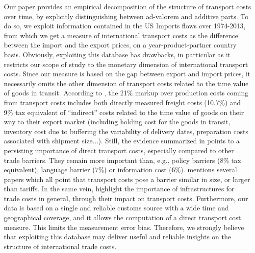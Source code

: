 \documentclass[a4paper,11pt]{article}
\begin{document}
Our paper provides an empirical decomposition of the structure of transport costs over time, by explicitly distinguishing between ad-valorem and additive parts. To do so, we exploit information contained in the US Imports flows over 1974-2013, from which we get a measure of international transport costs as the difference between the import and the export prices, on a year-product-partner country basis. Obviously, exploiting this database has drawbacks, in particular as it restricts our scope of study to the monetary dimension of international transport costs. Since our measure is based on the gap between export and import prices, it necessarily omits the other dimension of transport costs related to the time value of goods in transit. According to \citet{anderson_wincoop_jel}, the 21\% markup over production costs coming from transport costs includes both directly measured freight costs (10.7\%) and 9\% tax equivalent of ``indirect'' costs related to the time value of goods on their way to their export market (including holding cost for the goods in transit, inventory cost due to buffering the variability of delivery dates, preparation costs associated with shipment size...). Still, the evidence summarized in \citet{anderson_wincoop_jel} points to a persisting importance of direct transport costs, especially compared to other trade barriers. They remain more important than, e.g., policy barriers (8\% tax equivalent), language barrier (7\%) or information cost (6\%). \citet{Hummels_1999} mentions several papers which all point that transport costs pose a barrier similar in size, or larger than tariffs. In the same vein, \citet{limao_venables} highlight the importance of infrastructures for trade costs in general, through their impact on transport costs. Furthermore, our data is based on a single and reliable customs source with a wide time and geographical coverage, and it allows the computation of a direct transport cost measure. This limits the measurement error bias. Therefore, we strongly believe that exploiting this database may deliver useful and reliable insights on the structure of international trade costs.
\end{document}
